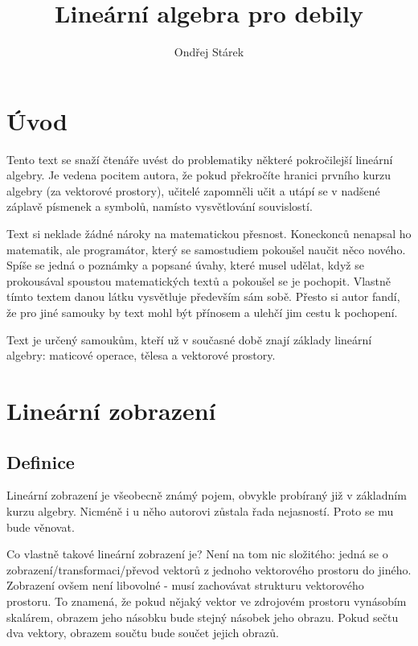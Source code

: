 \documentclass[a5paper,12pt]{amsbook}
\theoremstyle{definition}
\begin{document}
\title{Lineární algebra pro debily}
\author{Ondřej Stárek}
\maketitle

\tableofcontents

\chapter{Úvod}

\noindent Tento text se snaží čtenáře uvést do problematiky některé pokročilejší lineární algebry.
Je vedena pocitem autora, že pokud překročíte hranici prvního kurzu algebry (za vektorové
prostory), učitelé zapomněli učit a utápí se v nadšené záplavě písmenek a symbolů, namísto
vysvětlování souvislostí.

Text si neklade žádné nároky na matematickou přesnost. Koneckonců nenapsal ho matematik,
ale programátor, který se samostudiem pokoušel naučit něco nového. Spíše se jedná o poznámky
a popsané úvahy, které musel udělat, když se prokousával spoustou matematických textů
a pokoušel se je pochopit. Vlastně tímto textem danou látku vysvětluje především sám sobě.
Přesto si autor fandí, že pro jiné samouky by text mohl být přínosem a ulehčí jim cestu
k pochopení.

Text je určený samoukům, kteří už v současné době znají základy lineární algebry: maticové
operace, tělesa a vektorové prostory.

\chapter{Lineární zobrazení}

\section{Definice}

\noindent Lineární zobrazení je všeobecně známý pojem, obvykle probíraný již v základním kurzu
algebry. Nicméně i u něho autorovi zůstala řada nejasností. Proto se mu bude věnovat.

Co vlastně takové lineární zobrazení je? Není na tom nic složitého: jedná se
o zobrazení/transformaci/převod vektorů z jednoho vektorového prostoru do jiného. Zobrazení ovšem
není libovolné - musí zachovávat strukturu vektorového prostoru. To znamená, že pokud nějaký vektor
ve zdrojovém prostoru vynásobím skalárem, obrazem jeho násobku bude stejný násobek jeho obrazu. Pokud
sečtu dva vektory, obrazem součtu bude součet jejich obrazů. 
\end{document}
